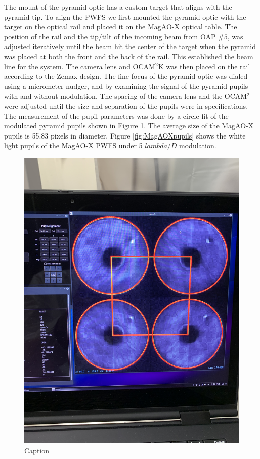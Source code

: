 The mount of the pyramid optic has a custom target that aligns with the pyramid tip. To align the PWFS we first mounted the pyramid optic with the target on the optical rail and placed it on the MagAO-X optical table. The position of the rail and the tip/tilt of the incoming beam from OAP $\#5$, was adjusted iteratively until the beam hit the center of the target when the pyramid was placed at both the front and the back of the rail. This established the beam line for the system. The camera lens and OCAM$^2$K was then placed on the rail according to the Zemax design. The fine focus of the pyramid optic was dialed using a micrometer nudger, and by examining the signal of the pyramid pupils with and without modulation. The spacing of the camera lens and the OCAM$^2$ were adjusted until the size and separation of the pupils were in specifications. The measurement of the pupil parameters was done by a circle fit of the modulated pyramid pupils shown in Figure \ref{fig:fitPupils}. The average size of the MagAO-X pupils is 55.83 pixels in diameter. Figure \ref{fig:MagAOXpupils} shows the white light pupils of the MagAO-X PWFS under 5 $lambda/D$ modulation.

\begin{figure}
    \centering
    \includegraphics{Chapter Materials/Chapter Three Materials/Age 170.668.jpeg}
    \caption{Caption}
    \label{fig:fitPupils}
\end{figure}

